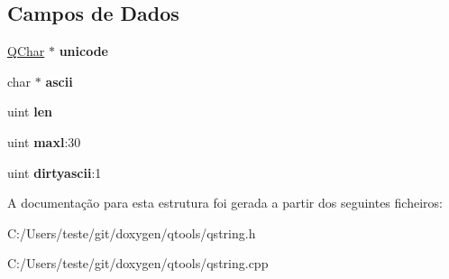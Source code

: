 \subsection*{Campos de Dados}
\begin{DoxyCompactItemize}
\item 
\hypertarget{struct_q_string_data_a0e63735de91cb71ad52be63ce6febad1}{\hyperlink{class_q_char}{Q\-Char} $\ast$ {\bfseries unicode}}\label{struct_q_string_data_a0e63735de91cb71ad52be63ce6febad1}

\item 
\hypertarget{struct_q_string_data_accf3302ac130520ad27aa57d2c3116b2}{char $\ast$ {\bfseries ascii}}\label{struct_q_string_data_accf3302ac130520ad27aa57d2c3116b2}

\item 
\hypertarget{struct_q_string_data_adc6f7cd3b6ef14af983b1294c313bc2d}{uint {\bfseries len}}\label{struct_q_string_data_adc6f7cd3b6ef14af983b1294c313bc2d}

\item 
\hypertarget{struct_q_string_data_a5995948e539d72f6d9985c2b46ea0957}{uint {\bfseries maxl}\-:30}\label{struct_q_string_data_a5995948e539d72f6d9985c2b46ea0957}

\item 
\hypertarget{struct_q_string_data_adf9ddccf05feb7fc7fb3a82acffbe6ac}{uint {\bfseries dirtyascii}\-:1}\label{struct_q_string_data_adf9ddccf05feb7fc7fb3a82acffbe6ac}

\end{DoxyCompactItemize}


A documentação para esta estrutura foi gerada a partir dos seguintes ficheiros\-:\begin{DoxyCompactItemize}
\item 
C\-:/\-Users/teste/git/doxygen/qtools/qstring.\-h\item 
C\-:/\-Users/teste/git/doxygen/qtools/qstring.\-cpp\end{DoxyCompactItemize}
